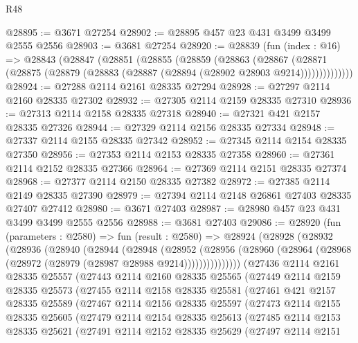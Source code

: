 \begin{lexlean}{R48}
\begin{coremodule}
@28895 := @3671 @27254
@28902 := @28895 @457 @23 @431 @3499 @3499 @2555 @2556
@28903 := @3681 @27254
@28920 := @28839
    (fun (index : @16) =>
    @28843
      (@28847
        (@28851
          (@28855
            (@28859
              (@28863
                (@28867
                  (@28871 (@28875 (@28879 (@28883 (@28887 (@28894 (@28902 @28903 @9214))))))))))))))
@28924 := @27288 @2114 @2161 @28335 @27294
@28928 := @27297 @2114 @2160 @28335 @27302
@28932 := @27305 @2114 @2159 @28335 @27310
@28936 := @27313 @2114 @2158 @28335 @27318
@28940 := @27321 @421 @2157 @28335 @27326
@28944 := @27329 @2114 @2156 @28335 @27334
@28948 := @27337 @2114 @2155 @28335 @27342
@28952 := @27345 @2114 @2154 @28335 @27350
@28956 := @27353 @2114 @2153 @28335 @27358
@28960 := @27361 @2114 @2152 @28335 @27366
@28964 := @27369 @2114 @2151 @28335 @27374
@28968 := @27377 @2114 @2150 @28335 @27382
@28972 := @27385 @2114 @2149 @28335 @27390
@28979 := @27394 @2114 @2148 @26861 @27403 @28335 @27407 @27412
@28980 := @3671 @27403
@28987 := @28980 @457 @23 @431 @3499 @3499 @2555 @2556
@28988 := @3681 @27403
@29086 := @28920
    (fun (parameters : @2580) =>
    fun (result : @2580) =>
    @28924
      (@28928
        (@28932
          (@28936
            (@28940
              (@28944
                (@28948
                  (@28952
                    (@28956
                      (@28960 (@28964 (@28968 (@28972 (@28979 (@28987 @28988 @9214)))))))))))))))
    (@27436
      @2114
      @2161
      @28335
      @25557
      (@27443
        @2114
        @2160
        @28335
        @25565
        (@27449
          @2114
          @2159
          @28335
          @25573
          (@27455
            @2114
            @2158
            @28335
            @25581
            (@27461
              @421
              @2157
              @28335
              @25589
              (@27467
                @2114
                @2156
                @28335
                @25597
                (@27473
                  @2114
                  @2155
                  @28335
                  @25605
                  (@27479
                    @2114
                    @2154
                    @28335
                    @25613
                    (@27485
                      @2114
                      @2153
                      @28335
                      @25621
                      (@27491
                        @2114
                        @2152
                        @28335
                        @25629
                        (@27497
                          @2114
                          @2151

\end{coremodule}
\end{lexlean}
